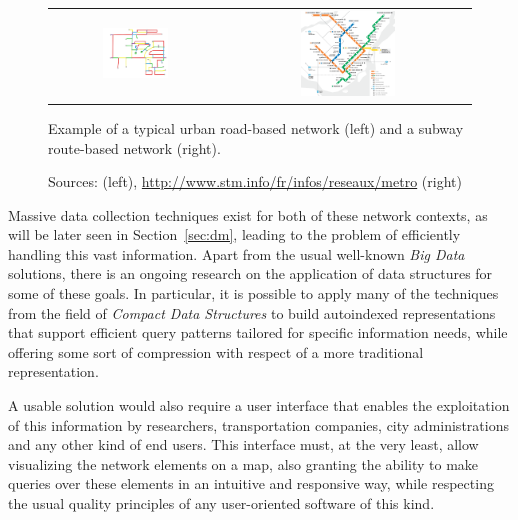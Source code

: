 \documentclass[a4paper,10pt,twoside]{book}
\begin{document}
	\begin{figure}[t]
		\begin{center}
			\begin{tabular}{cc}
				\includegraphics[width=0.4\textwidth]{figures/road-network.png} &
				\includegraphics[width=0.4\textwidth]{figures/mtl-metro-cut.png} \\
			\end{tabular}
		\end{center}
		\caption{Example of a typical urban road-based network (left) and a subway route-based network (right).}
		\caption*{\small Sources: \cite{boeing2017osmnx} (left), \url{http://www.stm.info/fr/infos/reseaux/metro} (right)}
		\label{fig:networks}
	\end{figure}
	
	Massive data collection techniques exist for both of these network contexts, as will be later seen in Section~\ref{sec:dm}, leading to the problem of efficiently handling this vast information. Apart from the usual well-known \textit{Big Data} solutions, there is an ongoing research on the application of data structures for some of these goals. In particular, it is possible to apply many of the techniques from the field of \textit{Compact Data Structures} to build autoindexed representations that support efficient query patterns tailored for specific information needs, while offering some sort of compression with respect of a more traditional representation.
	
	A usable solution would also require a user interface that enables the exploitation of this information by researchers, transportation companies, city administrations and any other kind of end users. This interface must, at the very least, allow visualizing the network elements on a map, also granting the ability to make queries over these elements in an intuitive and responsive way, while respecting the usual quality principles of any user-oriented software of this kind.
	
\end{document}
